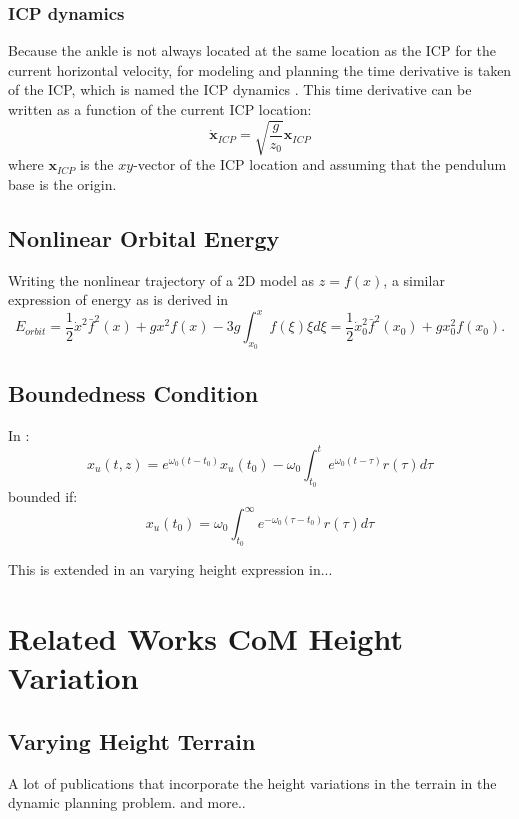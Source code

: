 \subsubsection{\ac{ICP} dynamics}
Because the ankle is not always located at the same location as the \ac{ICP} for the current horizontal velocity, for modeling and planning the time derivative is taken of the \ac{ICP}, which is named the \ac{ICP} dynamics \cite{koolen2012capturability}. This time derivative can be written as a function of the current \ac{ICP} location:
\begin{equation}
\boldsymbol{\dot{x}}_{ICP}=\sqrt{ \frac{g}{z_0}}\boldsymbol{x}_{ICP} 
\label{eq:cp}
\end{equation}
where $\boldsymbol{x}_{ICP}$ is the $xy$-vector of the \ac{ICP} location and assuming that the pendulum base is the origin.

\subsection{Nonlinear Orbital Energy}
Writing the nonlinear trajectory of a 2D model as $z=f(x)$, a similar expression of energy as \Elip  is derived in \cite{pratt2007derivation}
\begin{equation}
    E_{orbit}  = \frac{1}{2}\dot{x}^2\bar{f}^2(x)+gx^2f(x) - 3g\int_{x_0}^xf(\xi)\xi d\xi = \frac{1}{2}\dot{x}_0^2\bar{f}^2(x_0)+gx_0^2f(x_0).
\end{equation}
\Eorbit


\subsection{Boundedness Condition}
In \cite{lanari2014boundedness}:
\begin{equation}
x_u(t,z) = e^{\omega_0(t-t_0)}x_u(t_0) -\omega_0 \int_{t_0}^t e^{\omega_0(t-\tau)}r(\tau)d \tau
\end{equation}
bounded if:
\begin{equation}
x_u(t_0) = \omega_0 \int_{t_0}^{\infty} e^{-\omega_0(\tau-t_0)}r(\tau)d \tau
\end{equation}

This is extended in an varying height expression in...

\section{Related Works CoM Height Variation}
\subsection{Varying Height Terrain}
A lot of publications that incorporate the height variations in the terrain in the dynamic planning problem.
\cite{englsberger2013three} \cite{hopkins2014humanoid} and more..
